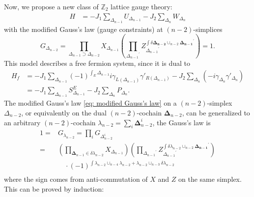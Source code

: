\documentclass[12pt]{article}
\newcommand{\ZZ}{{\mathbb Z}}
\newcommand{\g}{\gamma}
\begin{document}
Now, we propose a new class of $\ZZ_2$ lattice gauge theory:
\begin{equation}
    \begin{split}
        H &= - J_1 \sum_{\Delta_{n-1}} U_{\Delta_{n-1}} - J_2 \sum_{\Delta_{n}} W_{\Delta_{n}}
    \end{split}
\label{eq: modified Z2 lattice gauge theory}
\end{equation}
with the modified Gauss's law (gauge constraints) at $(n-2)$-simplices
\begin{equation}
    G_{\Delta_{n-2}} = \prod_{{\Delta_{n-1}} \supset {\Delta_{n-2}}} X_{\Delta_{n-1}}  (\prod_{{\Delta_{n-1}}^\prime} Z_{{\Delta_{n-1}}^\prime}^{\int \delta \boldsymbol {\Delta_{n-2}} \cup_{n-2} \boldsymbol {\Delta_{n-1}}^\prime})=1.
\label{eq: modified Gauss's law}
\end{equation}
This model describes a free fermion system, since it is dual to
\begin{equation}
    \begin{split}
        H_f &= - J_1 \sum_{\Delta_{n-1}} (-1)^{\int_E \Delta_{n-1}} i \g_{L(\Delta_{n-1})} \g'_{R(\Delta_{n-1})} - J_2 \sum_{\Delta_{n}} (- i \g_{{\Delta_{n}}} \g'_{\Delta_{n}}) \\
        &=  - J_1 \sum_{\Delta_{n-1}} S^E_{\Delta_{n-1}} - J_2 \sum_{\Delta_{n}} P_{\Delta_{n}}.
    \end{split}
\end{equation}
The modified Gauss's law \eqref{eq: modified Gauss's law} on a $(n-2)$-simplex $\Delta_{n-2}$, or equivalently on the dual $(n-2)$-cochain $\boldsymbol \Delta_{n-2}$, can be generalized to an arbitrary $(n-2)$-cochain $\lambda_{n-2} = \sum_{i} \boldsymbol \Delta^i_{n-2}$, the Gauss's law is
\begin{equation}
    \begin{split}
        1=&G_{\lambda_{n-2}} = \prod_{i} G_{\Delta^i_{n-2}} \\
        =& (\prod_{ \boldsymbol \Delta_{n-1} \in \delta \lambda_{n-2}} X_{\Delta_{n-1}})
        (\prod_{{\Delta_{n-1}}^\prime} Z_{{\Delta_{n-1}}^\prime}^{\int \delta \lambda_{n-2} \cup_{n-2} \boldsymbol {\Delta_{n-1}}^\prime}) \\
        & \quad \cdot (-1)^{\int \lambda_{n-2} \cup_{n-4} \lambda_{n-2} + \lambda_{n-2} \cup_{n-3} \delta \lambda_{n-2}}\\
    \end{split}
\label{eq: general gauge constraints}
\end{equation}
where the sign comes from anti-commutation of $X$ and $Z$ on the same simplex. This can be proved by induction:
\end{document}
